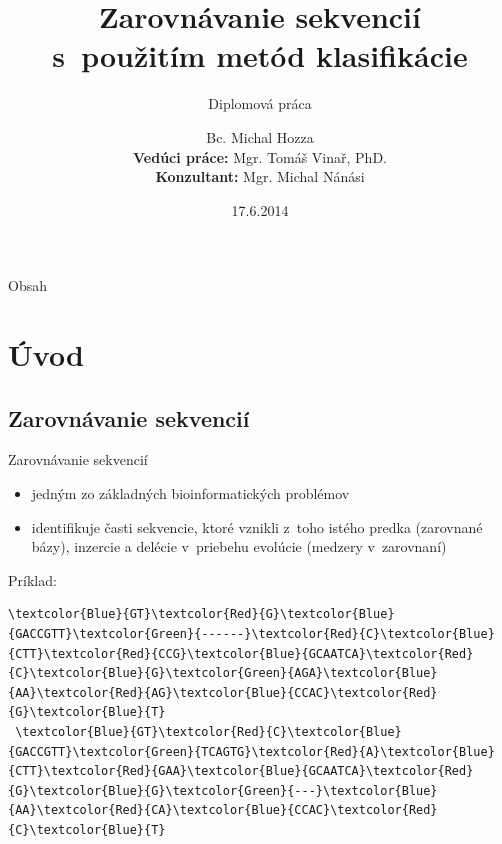 \documentclass[xcolor=dvipsnames, compress, 12pt]{beamer}
\title{Zarovnávanie sekvencií\\ s~použitím metód klasifikácie}
\subtitle{
\vspace{0.5cm}
\small Diplomová práca
}
\author[Michal Hozza]{\small Bc. Michal Hozza \\ \vspace{1cm} \footnotesize \textbf{Vedúci práce:} Mgr. Tomáš Vinař, PhD. \\ \textbf{Konzultant:} Mgr. Michal Nánási\\ \vspace{.5cm}}
\institute[FMFI UK \insertshortdate]{
  Fakulta matematiky, fyziky a informatiky,
  Univerzita Komenského, Bratislava\\
}
\date[\the\year]{\footnotesize 17.6.2014}
\theoremstyle{definition}
\begin{document}
\begin{frame}[plain]
  \titlepage
\end{frame}


\begin{frame}{Obsah}
  \transdissolve[duration=0.1]
  \tableofcontents
\end{frame}


\section{Úvod}

\subsection{Zarovnávanie sekvencií}
\begin{frame}[fragile]{Zarovnávanie sekvencií}
  \begin{itemize}
      \item jedným zo základných bioinformatických problémov
      \item identifikuje časti sekvencie, ktoré vznikli z~toho istého predka (zarovnané bázy), inzercie a delécie v~priebehu evolúcie (medzery v~zarovnaní)
  \end{itemize}
\pause
Príklad:
  \begin{Verbatim}[commandchars=\\\{\}]
 \textcolor{Blue}{GT}\textcolor{Red}{G}\textcolor{Blue}{GACCGTT}\textcolor{Green}{------}\textcolor{Red}{C}\textcolor{Blue}{CTT}\textcolor{Red}{CCG}\textcolor{Blue}{GCAATCA}\textcolor{Red}{C}\textcolor{Blue}{G}\textcolor{Green}{AGA}\textcolor{Blue}{AA}\textcolor{Red}{AG}\textcolor{Blue}{CCAC}\textcolor{Red}{G}\textcolor{Blue}{T}
 \textcolor{Blue}{GT}\textcolor{Red}{C}\textcolor{Blue}{GACCGTT}\textcolor{Green}{TCAGTG}\textcolor{Red}{A}\textcolor{Blue}{CTT}\textcolor{Red}{GAA}\textcolor{Blue}{GCAATCA}\textcolor{Red}{G}\textcolor{Blue}{G}\textcolor{Green}{---}\textcolor{Blue}{AA}\textcolor{Red}{CA}\textcolor{Blue}{CCAC}\textcolor{Red}{C}\textcolor{Blue}{T}
  \end{Verbatim}
\end{frame}
\end{document}
